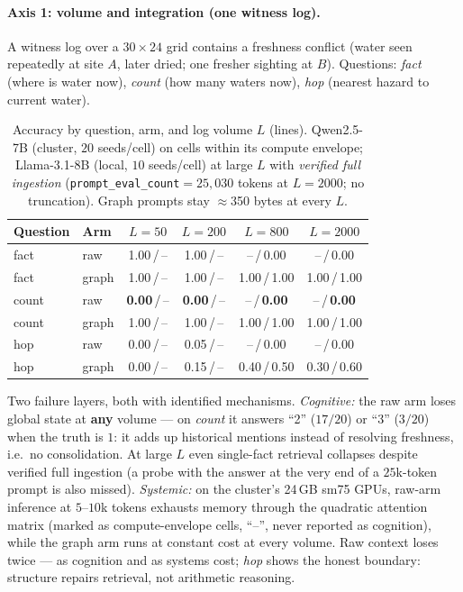 \documentclass{article}
\begin{document}
\paragraph{Axis 1: volume and integration (one witness log).}
A witness log over a $30{\times}24$ grid contains a freshness conflict (water
seen repeatedly at site $A$, later dried; one fresher sighting at $B$).
Questions: \emph{fact} (where is water now), \emph{count} (how many waters
now), \emph{hop} (nearest hazard to current water).

\begin{table}[h]
\caption{Accuracy by question, arm, and log volume $L$ (lines). Qwen2.5-7B (cluster, $20$ seeds/cell) on cells within its compute envelope; Llama-3.1-8B (local, $10$ seeds/cell) at large $L$ with \emph{verified full ingestion} (\texttt{prompt\_eval\_count}${=}25{,}030$ tokens at $L{=}2000$; no truncation). Graph prompts stay $\approx$350 bytes at every $L$.}
\label{p4:tab:ctx-axis1}
\centering
\small
\begin{tabular}{l l c c c c}
\toprule
Question & Arm & $L{=}50$ & $L{=}200$ & $L{=}800$ & $L{=}2000$ \\
\midrule
fact  & raw   & 1.00\,/\,--   & 1.00\,/\,--   & --\,/\,0.00 & --\,/\,0.00 \\
fact  & graph & 1.00\,/\,--   & 1.00\,/\,--   & 1.00\,/\,1.00 & 1.00\,/\,1.00 \\
count & raw   & \textbf{0.00}\,/\,-- & \textbf{0.00}\,/\,-- & --\,/\,\textbf{0.00} & --\,/\,\textbf{0.00} \\
count & graph & 1.00\,/\,--   & 1.00\,/\,--   & 1.00\,/\,1.00 & 1.00\,/\,1.00 \\
hop   & raw   & 0.00\,/\,--   & 0.05\,/\,--   & --\,/\,0.00 & --\,/\,0.00 \\
hop   & graph & 0.00\,/\,--   & 0.15\,/\,--   & 0.40\,/\,0.50 & 0.30\,/\,0.60 \\
\bottomrule
\end{tabular}
\end{table}

Two failure layers, both with identified mechanisms. \emph{Cognitive:} the raw
arm loses global state at \textbf{any} volume --- on \emph{count} it answers
``2'' ($17/20$) or ``3'' ($3/20$) when the truth is $1$: it adds up historical
mentions instead of resolving freshness, i.e.\ no consolidation. At large $L$
even single-fact retrieval collapses despite verified full ingestion (a probe
with the answer at the very end of a $25$k-token prompt is also missed).
\emph{Systemic:} on the cluster's 24\,GB sm75 GPUs, raw-arm inference at
$5$--$10$k tokens exhausts memory through the quadratic attention matrix
(marked as compute-envelope cells, ``--'', never reported as cognition), while
the graph arm runs at constant cost at every volume. Raw context loses twice
--- as cognition and as systems cost; \emph{hop} shows the honest boundary:
structure repairs retrieval, not arithmetic reasoning.
\end{document}
